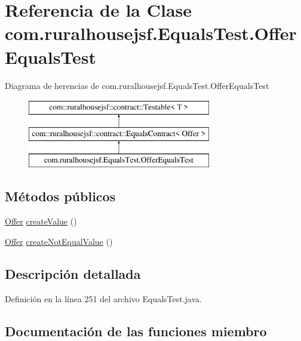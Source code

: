\hypertarget{classcom_1_1ruralhousejsf_1_1_equals_test_1_1_offer_equals_test}{}\section{Referencia de la Clase com.\+ruralhousejsf.\+Equals\+Test.\+Offer\+Equals\+Test}
\label{classcom_1_1ruralhousejsf_1_1_equals_test_1_1_offer_equals_test}
Diagrama de herencias de com.\+ruralhousejsf.\+Equals\+Test.\+Offer\+Equals\+Test\begin{figure}[H]
\begin{center}
\leavevmode
\includegraphics[height=3.000000cm]{d5/d5b/classcom_1_1ruralhousejsf_1_1_equals_test_1_1_offer_equals_test}
\end{center}
\end{figure}
\subsection*{Métodos públicos}
\begin{DoxyCompactItemize}
\item 
\mbox{\hyperlink{classcom_1_1ruralhousejsf_1_1domain_1_1_offer}{Offer}} \mbox{\hyperlink{classcom_1_1ruralhousejsf_1_1_equals_test_1_1_offer_equals_test_a25524d0ab8278899774751c0f7630e8d}{create\+Value}} ()
\item 
\mbox{\hyperlink{classcom_1_1ruralhousejsf_1_1domain_1_1_offer}{Offer}} \mbox{\hyperlink{classcom_1_1ruralhousejsf_1_1_equals_test_1_1_offer_equals_test_a459de0dbb86bdaa6f54b99eb887a2eab}{create\+Not\+Equal\+Value}} ()
\end{DoxyCompactItemize}


\subsection{Descripción detallada}


Definición en la línea 251 del archivo Equals\+Test.\+java.



\subsection{Documentación de las funciones miembro}
\mbox{\label{classcom_1_1ruralhousejsf_1_1_equals_test_1_1_offer_equals_test_a459de0dbb86bdaa6f54b99eb887a2eab}} 
